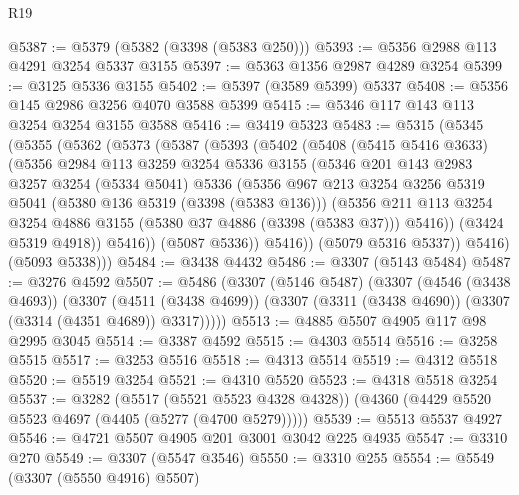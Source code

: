 \begin{lexlean}{R19}
\begin{coremodule}
@5387 := @5379 (@5382 (@3398 (@5383 @250)))
@5393 := @5356 @2988 @113 @4291 @3254 @5337 @3155
@5397 := @5363 @1356 @2987 @4289 @3254
@5399 := @3125 @5336 @3155
@5402 := @5397 (@3589 @5399) @5337
@5408 := @5356 @145 @2986 @3256 @4070 @3588 @5399
@5415 := @5346 @117 @143 @113 @3254 @3254 @3155 @3588
@5416 := @3419 @5323
@5483 := @5315
    (@5345
      (@5355
        (@5362
          (@5373
            (@5387
              (@5393
                (@5402
                  (@5408
                    (@5415 @5416 @3633)
                    (@5356
                      @2984
                      @113
                      @3259
                      @3254
                      @5336
                      @3155
                      (@5346
                        @201
                        @143
                        @2983
                        @3257
                        @3254
                        (@5334 @5041)
                        @5336
                        (@5356
                          @967
                          @213
                          @3254
                          @3256
                          @5319
                          @5041
                          (@5380 @136 @5319 (@3398 (@5383 @136)))
                          (@5356
                            @211
                            @113
                            @3254
                            @3254
                            @4886
                            @3155
                            (@5380 @37 @4886 (@3398 (@5383 @37)))
                            @5416))
                        (@3424 @5319 @4918))
                      @5416))
                  (@5087 @5336))
                @5416))
            (@5079 @5316 @5337))
          @5416)
        (@5093 @5338)))
@5484 := @3438 @4432
@5486 := @3307 (@5143 @5484)
@5487 := @3276 @4592
@5507 := @5486
    (@3307
      (@5146 @5487)
      (@3307
        (@4546 (@3438 @4693))
        (@3307
          (@4511 (@3438 @4699))
          (@3307 (@3311 (@3438 @4690)) (@3307 (@3314 (@4351 @4689)) @3317)))))
@5513 := @4885 @5507 @4905 @117 @98 @2995 @3045
@5514 := @3387 @4592
@5515 := @4303 @5514
@5516 := @3258 @5515
@5517 := @3253 @5516
@5518 := @4313 @5514
@5519 := @4312 @5518
@5520 := @5519 @3254
@5521 := @4310 @5520
@5523 := @4318 @5518 @3254
@5537 := @3282
    (@5517 (@5521 @5523 @4328 @4328))
    (@4360 (@4429 @5520 @5523 @4697 (@4405 (@5277 (@4700 @5279)))))
@5539 := @5513 @5537 @4927
@5546 := @4721 @5507 @4905 @201 @3001 @3042 @225 @4935
@5547 := @3310 @270
@5549 := @3307 (@5547 @3546)
@5550 := @3310 @255
@5554 := @5549 (@3307 (@5550 @4916) @5507)

\end{coremodule}
\end{lexlean}
